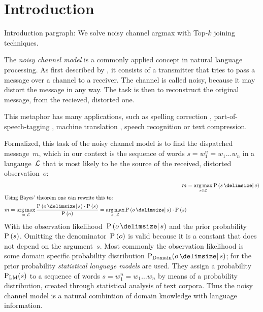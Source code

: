 \chapter{Introduction}

\begin{draft}
Introduction pargraph: We solve noisy channel argmax with Top-$k$ joining
techniques.
\end{draft}

The \emph{noisy channel model} is a commonly applied concept in natural language
processing.
As first described by \textcite{Shannon1948}, it consists of a transmitter that
tries to pass a message over a channel to a receiver.
The channel is called noisy, because it may distort the message in any way.
The task is then to reconstruct the original message, from the recieved,
distorted one.

This metaphor has many applications, such as spelling correction
\parencite{JurafskyMartin2009,Manning2008,Kernighan1990,Mays1991},
part-of-speech-tagging \parencite{Church1988}, machine translation
\parencite{Brown1990}, speech recognition or text compression.

Formalized, this task of the noisy channel model is to find the dispatched
message~$m$, which in our context is the sequence of words
$s = w_1^n = w_1 \ldots w_n$ in a langauge~$\mathcal{L}$ that is most likely to be
the source of the received, distorted observation~$o$:
\begin{align}
  \label{eq:noisychannel}
  m &= \Argmax_{s \in \Language} \Prob{s}{o} \\
  \intertext{Using Bayes' theorem one can rewrite this to:}
  \label{eq:noisychannelbayes}
  \begin{split}
    m = \Argmax_{s \in \Language} \frac{\Prob{o}{s} \cdot \Prob{s}}{\Prob{o}}
      = \Argmax_{s \in \Language} \Prob{o}{s} \cdot \Prob{s}
  \end{split}
\end{align}
With the observation likelihood~$\Prob{o}{s}$ and the prior
probability~$\Prob{s}$.
Omitting the denominator~$\Prob{o}$ is valid because it is a constant that does
not depend on the argument~$s$.
Most commonly the observation likelihood is some domain specific probability
distribution $\Prob[\text{Domain}]{o}{s}$; for the prior probability
\emph{statistical language models} are used.
They assign a probability $\Prob[\text{LM}]{s}$ to a sequence of words
$s = w_1^n = w_1 \ldots w_n$ by means of a probability distribution, created
through statistical analysis of text corpora.
Thus the noisy channel model is a natural combintion of domain knowledge with
language information.

